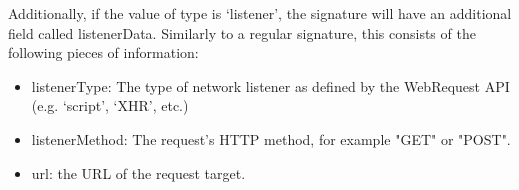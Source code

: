 Additionally, if the value of type is `listener', the signature will have an additional field called listenerData. Similarly to a regular signature, this consists of the following pieces of information:
\begin{itemize}
	\item 
	listenerType: The type of network listener as defined by the WebRequest API (e.g. `script', `XHR', etc.)
	\item
	listenerMethod: The request's HTTP method, for example "GET" or "POST".
	\item
	url: the URL of the request target.
\end{itemize}
